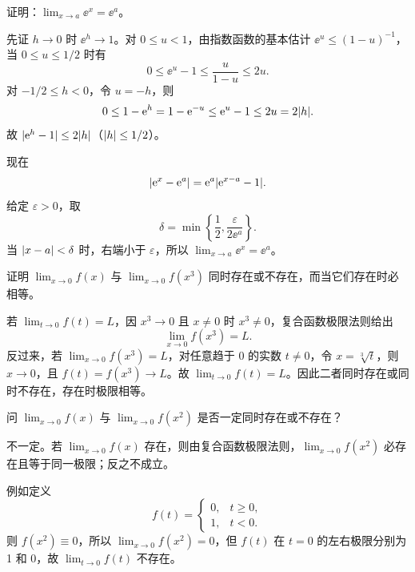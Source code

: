 \begin{xexercise}[8]
证明：$\displaystyle\lim_{x\to a}\ee^x=\ee^a$。
\end{xexercise}
\begin{xsolution}
先证 $h\to0$ 时 $\ee^h\to1$。对 $0\leq u<1$，由指数函数的基本估计
$\ee^u\leq(1-u)^{-1}$，当 $0\leq u\leq1/2$ 时有
\[
  0\leq\ee^u-1\leq\frac{u}{1-u}\leq2u.
\]
对 $-1/2\leq h<0$，令 $u=-h$，则
\[
  0\leq1-\mathrm{e}^h=1-\mathrm{e}^{-u}\leq\mathrm{e}^u-1\leq2u=2\lvert h\rvert.
\]
故 $\lvert\mathrm{e}^h-1\rvert\leq2\lvert h\rvert$（$\lvert h\rvert\leq1/2$）。

现在
\[
  \lvert\mathrm{e}^x-\mathrm{e}^a\rvert=\mathrm{e}^a\lvert\mathrm{e}^{x-a}-1\rvert.
\]
给定 $\varepsilon>0$，取
\[
  \delta=\min\left\{\frac12,\frac{\varepsilon}{2\ee^a}\right\}.
\]
当 $\lvert x-a\rvert<\delta$ 时，右端小于 $\varepsilon$，所以
$\lim_{x\to a}\ee^x=\ee^a$。
\end{xsolution}


\begin{xexercise}[9]
证明 $\displaystyle\lim_{x\to0}f(x)$ 与 $\displaystyle\lim_{x\to0}f(x^3)$ 同时存在或不存在，而当它们存在时必相等。
\end{xexercise}
\begin{xsolution}
若 $\lim_{t\to0}f(t)=L$，因 $x^3\to0$ 且 $x\ne0$ 时 $x^3\ne0$，复合函数极限法则给出
\[
  \lim_{x\to0}f(x^3)=L.
\]
反过来，若 $\lim_{x\to0}f(x^3)=L$，对任意趋于 0 的实数 $t\ne0$，令 $x=\sqrt[3]t$，则 $x\to0$，且
$f(t)=f(x^3)\to L$。故 $\lim_{t\to0}f(t)=L$。因此二者同时存在或同时不存在，存在时极限相等。
\end{xsolution}


\begin{xexercise}[10]
问 $\displaystyle\lim_{x\to0}f(x)$ 与 $\displaystyle\lim_{x\to0}f(x^2)$ 是否一定同时存在或不存在？
\end{xexercise}
\begin{xsolution}
不一定。若 $\lim_{x\to0}f(x)$ 存在，则由复合函数极限法则，$\lim_{x\to0}f(x^2)$ 必存在且等于同一极限；反之不成立。

例如定义
\[
  f(t)=\begin{cases}
    0,&t\geq0,\\
    1,&t<0.
  \end{cases}
\]
则 $f(x^2)\equiv0$，所以 $\lim_{x\to0}f(x^2)=0$，但 $f(t)$ 在 $t=0$ 的左右极限分别为 1 和 0，故 $\lim_{t\to0}f(t)$ 不存在。
\end{xsolution}


